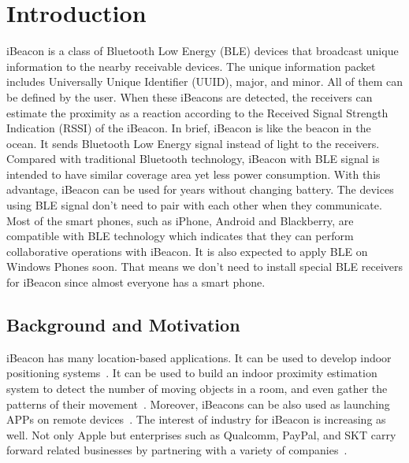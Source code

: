 \documentclass[12pt]{report}
\begin{document}


\setcounter{page}{1}

% 
%
\chapter{Introduction}
iBeacon is a class of Bluetooth Low Energy (BLE) devices that broadcast unique information to the nearby receivable devices. The unique information packet includes Universally Unique Identifier (UUID), major, and minor. All of them can be defined by the user. When these iBeacons are detected, the receivers can estimate the proximity as a reaction according to the Received Signal Strength Indication (RSSI) of the iBeacon. In brief, iBeacon is like the beacon in the ocean. It sends Bluetooth Low Energy signal instead of light to the receivers. Compared with traditional Bluetooth technology, iBeacon with BLE signal is intended to have similar coverage area yet less power consumption. With this advantage, iBeacon can be used for years without changing battery. The devices using BLE signal don't need to pair with each other when they communicate. Most of the smart phones, such as iPhone, Android and Blackberry, are compatible with BLE technology which indicates that they can perform collaborative operations with iBeacon. It is also expected to apply BLE on Windows Phones soon. That means we don't need to install special BLE receivers for iBeacon since almost everyone has a smart phone.

\section{Background and Motivation}
iBeacon has many location-based applications. It can be used to develop indoor positioning systems~\cite{Mar14}\cite{Gen15}. It can be used to build an indoor proximity estimation system to detect the number of moving objects in a room, and even gather the patterns of their movement~\cite{Cor15}. Moreover, iBeacons can be also used as launching APPs on remote devices~\cite{Bas14}. The interest of industry for iBeacon is increasing as well. Not only Apple but enterprises such as Qualcomm, PayPal, and SKT carry forward related businesses by partnering with a variety of companies~\cite{Kim14}.
\end{document}
